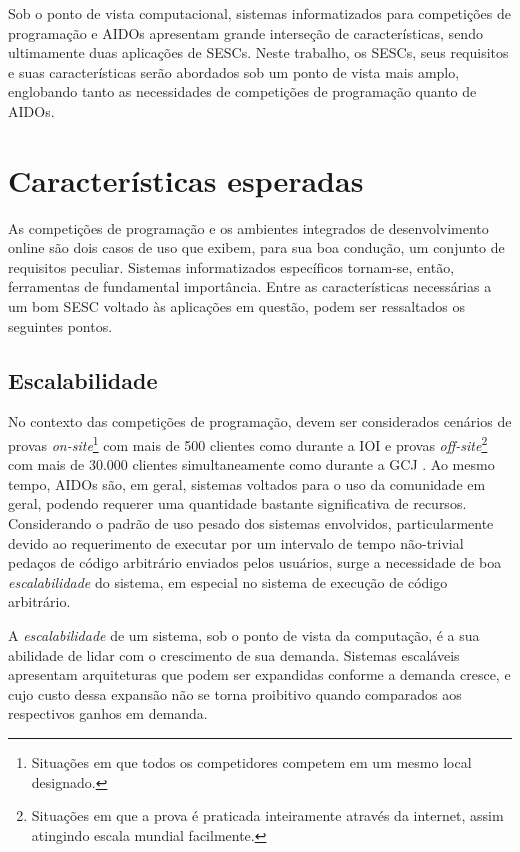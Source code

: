 \documentclass[ruledheader, 12pt]{abnt}
\begin{document}
Sob o ponto de vista computacional, sistemas informatizados para competições de programação e AIDOs apresentam grande interseção de características, sendo ultimamente duas aplicações de SESCs. Neste trabalho, os SESCs, seus requisitos e suas características serão abordados sob um ponto de vista mais amplo, englobando tanto as necessidades de competições de programação quanto de AIDOs.

\section{Características esperadas}

As competições de programação e os ambientes integrados de desenvolvimento online são dois casos de uso que exibem, para sua boa condução, um conjunto de requisitos peculiar. Sistemas informatizados específicos tornam-se, então, ferramentas de fundamental importância. Entre as características necessárias a um bom SESC voltado às aplicações em questão, podem ser ressaltados os seguintes pontos.

\subsection{Escalabilidade}

No contexto das competições de programação, devem ser considerados cenários de provas \emph{on-site}\footnote{Situações em que todos os competidores competem em um mesmo local designado.} com mais de 500 clientes como durante a IOI \cite{ioi-nl1-2007} e provas \emph{off-site}\footnote{Situações em que a prova é praticada inteiramente através da internet, assim atingindo escala mundial facilmente.} com mais de 30.000 clientes simultaneamente como durante a GCJ \cite{googlecodejamhistory}. Ao mesmo tempo, AIDOs são, em geral, sistemas voltados para o uso da comunidade em geral, podendo requerer uma quantidade bastante significativa de recursos. Considerando o padrão de uso pesado dos sistemas envolvidos, particularmente devido ao requerimento de executar por um intervalo de tempo não-trivial pedaços de código arbitrário enviados pelos usuários, surge a necessidade de boa \emph{escalabilidade} do sistema, em especial no sistema de execução de código arbitrário.

A \emph{escalabilidade} de um sistema, sob o ponto de vista da computação, é a sua abilidade de lidar com o crescimento de sua demanda. Sistemas escaláveis apresentam arquiteturas que podem ser expandidas conforme a demanda cresce, e cujo custo dessa expansão não se torna proibitivo quando comparados aos respectivos ganhos em demanda.
\end{document}
